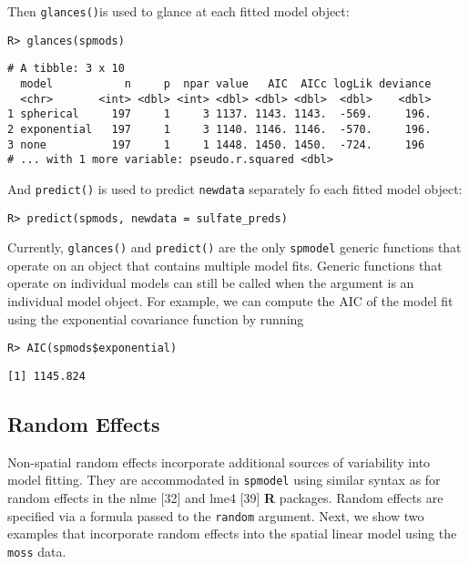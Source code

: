 \documentclass[10pt,letterpaper]{article}
\begin{document}
\noindent Then \texttt{glances()}is used to glance at each fitted model
object:

\begin{verbatim}
R> glances(spmods)
\end{verbatim}

\begin{verbatim}
# A tibble: 3 x 10
  model           n     p  npar value   AIC  AICc logLik deviance
  <chr>       <int> <dbl> <int> <dbl> <dbl> <dbl>  <dbl>    <dbl>
1 spherical     197     1     3 1137. 1143. 1143.  -569.     196.
2 exponential   197     1     3 1140. 1146. 1146.  -570.     196.
3 none          197     1     1 1448. 1450. 1450.  -724.     196 
# ... with 1 more variable: pseudo.r.squared <dbl>
\end{verbatim}

\noindent And \texttt{predict()} is used to predict \texttt{newdata}
separately fo each fitted model object:

\begin{verbatim}
R> predict(spmods, newdata = sulfate_preds)
\end{verbatim}

Currently, \texttt{glances()} and \texttt{predict()} are the only
\texttt{spmodel} generic functions that operate on an object that
contains multiple model fits. Generic functions that operate on
individual models can still be called when the argument is an individual
model object. For example, we can compute the AIC of the model fit using
the exponential covariance function by running

\begin{verbatim}
R> AIC(spmods$exponential)
\end{verbatim}

\begin{verbatim}
[1] 1145.824
\end{verbatim}

\hypertarget{random-effects}{%
\subsection{Random Effects}\label{random-effects}}

Non-spatial random effects incorporate additional sources of variability
into model fitting. They are accommodated in \texttt{spmodel} using
similar syntax as for random effects in the nlme {[}32{]} and lme4
{[}39{]} \textbf{\textsf{R}} packages. Random effects are specified via
a formula passed to the \texttt{random} argument. Next, we show two
examples that incorporate random effects into the spatial linear model
using the \texttt{moss} data.
\end{document}
